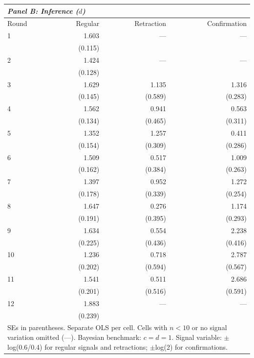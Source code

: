 \begin{table}[htbp]
\begin{tabular}{lrrr}
\multicolumn{4}{l}{\textit{Panel B: Inference ($d$)}} \\
\hline
Round & Regular & Retraction & Confirmation \\
\hline
1 & 1.603 & --- & ---
 \\
 & (0.115) &  & 
 \\
2 & 1.424 & --- & ---
 \\
 & (0.128) &  & 
 \\
3 & 1.629 & 1.135 & 1.316
 \\
 & (0.145) & (0.589) & (0.283)
 \\
4 & 1.562 & 0.941 & 0.563
 \\
 & (0.134) & (0.465) & (0.311)
 \\
5 & 1.352 & 1.257 & 0.411
 \\
 & (0.154) & (0.309) & (0.286)
 \\
6 & 1.509 & 0.517 & 1.009
 \\
 & (0.162) & (0.384) & (0.263)
 \\
7 & 1.397 & 0.952 & 1.272
 \\
 & (0.178) & (0.339) & (0.254)
 \\
8 & 1.647 & 0.276 & 1.174
 \\
 & (0.191) & (0.395) & (0.293)
 \\
9 & 1.634 & 0.554 & 2.238
 \\
 & (0.225) & (0.436) & (0.416)
 \\
10 & 1.236 & 0.718 & 2.787
 \\
 & (0.202) & (0.594) & (0.567)
 \\
11 & 1.541 & 0.511 & 2.686
 \\
 & (0.201) & (0.516) & (0.591)
 \\
12 & 1.883 & --- & ---
 \\
 & (0.239) &  & 
 \\
\hline

\multicolumn{4}{p{0.85\textwidth}}{\small SEs in parentheses. Separate OLS per cell. Cells with $n<10$ or no signal variation omitted (---). Bayesian benchmark: $c=d=1$. Signal variable: $\pm$log(0.6/0.4) for regular signals and retractions; $\pm$log(2) for confirmations.} \\
\end{tabular}
\end{table}
